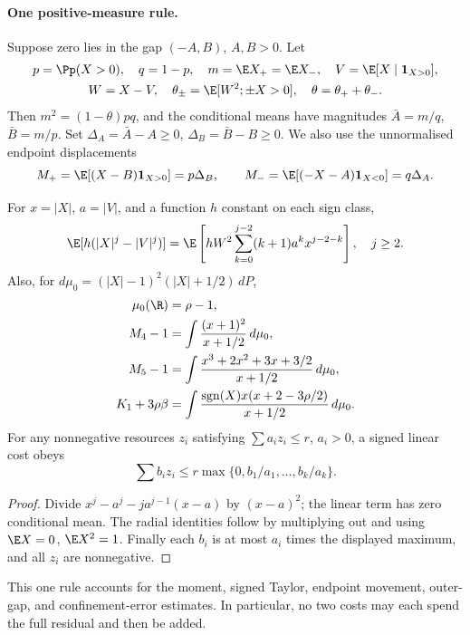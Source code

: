 \paragraph{One positive-measure rule.}
Suppose zero lies in the gap $(-A,B)$, $A,B>0$. Let
\[\begin{gathered}
 p=\Pp(X>0),\quad q=1-p,\quad m=\E X_+=\E X_-,\quad V=\E[X\mid\mathbf1_{X>0}],\\
 W=X-V,\quad\theta_\pm=\E[W^2;\pm X>0],\quad\theta=\theta_++\theta_-.
\end{gathered}\]
Then $m^2=(1-\theta)pq$, and the conditional means have magnitudes
$\bar A=m/q$, $\bar B=m/p$. Set
$\Delta_A=\bar A-A\ge0$, $\Delta_B=\bar B-B\ge0$.
We also use the unnormalised endpoint displacements
\[
 M_+=\E[(X-B)\mathbf1_{X>0}]=p\Delta_B,\qquad
 M_-=\E[(-X-A)\mathbf1_{X<0}]=q\Delta_A.
\]

\begin{lemma}\label{j:local:re:pricing}
For $x=|X|$, $a=|V|$, and a function $h$ constant on each sign class,
\begin{equation}\label{j:local:re:conditional}
 \E[h(|X|^j-|V|^j)]
 =\E\left[hW^2\sum_{k=0}^{j-2}(k+1)a^kx^{j-2-k}\right],\quad j\ge2.
\end{equation}
Also, for $d\mu_0=(|X|-1)^2(|X|+1/2)\,dP$,
\begin{align*}
 \mu_0(\R)&=\rho-1,\\
 M_4-1&=\int\frac{(x+1)^2}{x+1/2}\,d\mu_0,\\
 M_5-1&=\int\frac{x^3+2x^2+3x+3/2}{x+1/2}\,d\mu_0,\\
 K_1+3\rho\beta&=\int
  \frac{\operatorname{sgn}(X)x(x+2-3\rho/2)}{x+1/2}\,d\mu_0.
\end{align*}
For any nonnegative resources $z_i$ satisfying $\sum a_i z_i\le r$,
$a_i>0$, a signed linear cost obeys
\begin{equation}\label{j:local:re:simplex}
 \sum b_i z_i\le r\max\{0,b_1/a_1,\ldots,b_k/a_k\}.
\end{equation}
\end{lemma}
\begin{proof}
Divide $x^j-a^j-ja^{j-1}(x-a)$ by $(x-a)^2$; the linear term has
zero conditional mean. The radial identities follow by multiplying
out and using $\E X=0$, $\E X^2=1$. Finally each $b_i$ is at most
$a_i$ times the displayed maximum, and all $z_i$ are nonnegative.
\end{proof}

This one rule accounts for the moment, signed Taylor, endpoint movement,
outer-gap, and confinement-error estimates. In particular, no two costs
may each spend the full residual and then be added.



